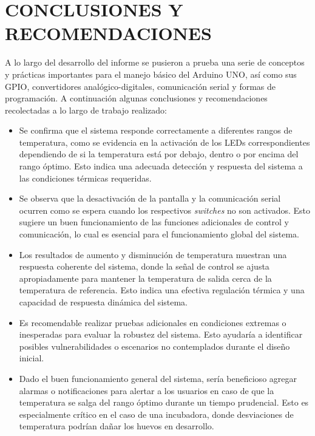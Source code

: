 \newpage
\section{CONCLUSIONES Y RECOMENDACIONES}
A lo largo del desarrollo del informe se pusieron a prueba una serie de conceptos y prácticas importantes para el manejo básico del Arduino UNO, así como sus GPIO, convertidores analógico-digitales, comunicación serial y formas de programación. A continuación algunas conclusiones y recomendaciones recolectadas a lo largo de trabajo realizado: 

\begin{itemize}
    \item Se confirma que el sistema responde correctamente a diferentes rangos de temperatura, como se evidencia en la activación de los LEDs correspondientes dependiendo de si la temperatura está por debajo, dentro o por encima del rango óptimo. Esto indica una adecuada detección y respuesta del sistema a las condiciones térmicas requeridas.

    \item  Se observa que la desactivación de la pantalla y la comunicación serial ocurren como se espera cuando los respectivos \textit{switches} no son activados. Esto sugiere un buen funcionamiento de las funciones adicionales de control y comunicación, lo cual es esencial para el funcionamiento global del sistema.

    \item Los resultados de aumento y disminución de temperatura muestran una respuesta coherente del sistema, donde la señal de control se ajusta apropiadamente para mantener la temperatura de salida cerca de la temperatura de referencia. Esto indica una efectiva regulación térmica y una capacidad de respuesta dinámica del sistema.

    \item Es recomendable realizar pruebas adicionales en condiciones extremas o inesperadas para evaluar la robustez del sistema. Esto ayudaría a identificar posibles vulnerabilidades o escenarios no contemplados durante el diseño inicial.

    \item Dado el buen funcionamiento general del sistema, sería beneficioso agregar alarmas o notificaciones para alertar a los usuarios en caso de que la temperatura se salga del rango óptimo durante un tiempo prudencial. Esto es especialmente crítico en el caso de una incubadora, donde desviaciones de temperatura podrían dañar los huevos en desarrollo.
\end{itemize} 